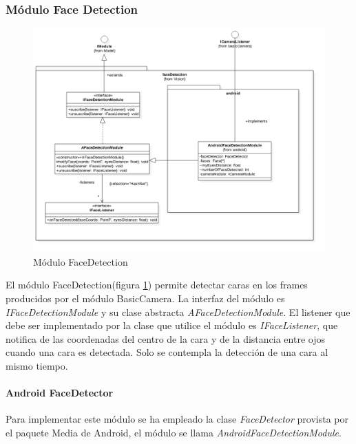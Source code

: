 \subsubsection{Módulo Face Detection}
\begin{figure}
	\centering
	\includegraphics[width=1\linewidth]{imagenes/diagramas/FaceDetectionModule.png}
	\caption{Módulo FaceDetection}
	\label{fig:face-detection-module}
\end{figure}
El módulo FaceDetection(figura \ref{fig:face-detection-module}) permite detectar caras en los frames producidos por el módulo BasicCamera. La interfaz del módulo es \textit{IFaceDetectionModule} y su clase abstracta \textit{AFaceDetectionModule}. El listener que debe ser implementado por la clase que utilice el módulo es \textit{IFaceListener}, que notifica de las coordenadas del centro de la cara y de la distancia entre ojos cuando una cara es detectada. Solo se contempla la detección de una cara al mismo tiempo.

\paragraph*{Android FaceDetector\\}
Para implementar este módulo se ha empleado la clase \textit{FaceDetector} provista por el paquete Media de Android, el módulo se llama \textit{AndroidFaceDetectionModule}.
\newpage

